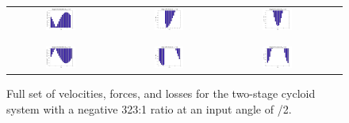 \begin{figure}[t]
   \centering
   \begin{tabular}{cccc}
	   \includegraphics[width=0.30\textwidth]{fig/double_1_neg_vel_pi_2} &
	   \includegraphics[width=0.30\textwidth]{fig/double_1_neg_forces_pi_2} &
	   \includegraphics[width=0.30\textwidth]{fig/double_1_neg_losses_pi_2} \\
	   \\
	   \hline
	   \\
	   \includegraphics[width=0.30\textwidth]{fig/double_2_neg_vel_pi_2} &
	   \includegraphics[width=0.30\textwidth]{fig/double_2_neg_forces_pi_2} &
	   \includegraphics[width=0.30\textwidth]{fig/double_2_neg_losses_pi_2} \\
   \end{tabular}
   \caption{Full set of velocities, forces, and losses for the two-stage cycloid system with a negative 323:1 ratio at an input angle of \textpi/2.}
   \label{fig:two_stage_forces_neg}
\end{figure}

